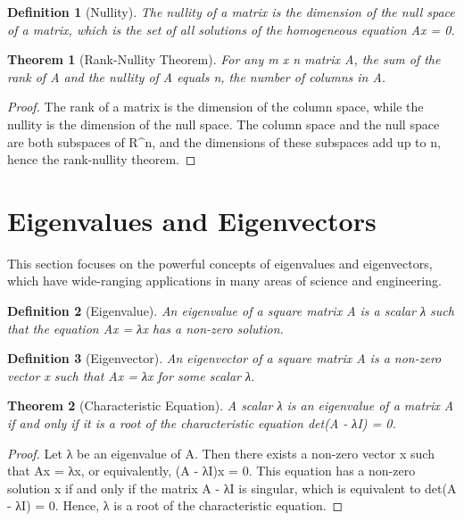 \documentclass{article}
\newtheorem{definition}{Definition}[section]
\newtheorem{theorem}{Theorem}[section]
\begin{document}
\begin{definition}[Nullity]
The nullity of a matrix is the dimension of the null space of a matrix, which is the set of all solutions of the homogeneous equation Ax = 0.
\end{definition}

\begin{theorem}[Rank-Nullity Theorem]
For any m x n matrix A, the sum of the rank of A and the nullity of A equals n, the number of columns in A.
\end{theorem}

\begin{proof}
The rank of a matrix is the dimension of the column space, while the nullity is the dimension of the null space. The column space and the null space are both subspaces of R^n, and the dimensions of these subspaces add up to n, hence the rank-nullity theorem.
\end{proof}

\section{Eigenvalues and Eigenvectors}
This section focuses on the powerful concepts of eigenvalues and eigenvectors, which have wide-ranging applications in many areas of science and engineering.

\begin{definition}[Eigenvalue]
An eigenvalue of a square matrix A is a scalar λ such that the equation Ax = λx has a non-zero solution.
\end{definition}

\begin{definition}[Eigenvector]
An eigenvector of a square matrix A is a non-zero vector x such that Ax = λx for some scalar λ.
\end{definition}

\begin{theorem}[Characteristic Equation]
A scalar λ is an eigenvalue of a matrix A if and only if it is a root of the characteristic equation det(A - λI) = 0.
\end{theorem}

\begin{proof}
Let λ be an eigenvalue of A. Then there exists a non-zero vector x such that Ax = λx, or equivalently, (A - λI)x = 0. This equation has a non-zero solution x if and only if the matrix A - λI is singular, which is equivalent to det(A - λI) = 0. Hence, λ is a root of the characteristic equation.
\end{proof}
\end{document}
